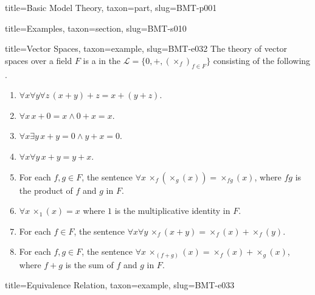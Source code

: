 \documentclass[a4paper]{article}
\begin{document}
\begin{tree}{title={Basic Model Theory}, taxon={part}, slug={BMT-p001}}
\begin{tree}{title={Examples}, taxon={section}, slug={BMT-s010}}
\begin{tree}{title={Vector Spaces}, taxon={example}, slug={BMT-e032}}
    The theory of vector spaces over a field \(F\) is a  in the  \(\mathcal  L= \{ 0,+,( \times _f)_{f \in  F} \}\)
    consisting of the following .
    \begin{enumerate}
\item{\(\forall  x \forall  y \forall  z \, (x+y)+z=x+(y+z)\).
        }
        \item{\(\forall  x \, x+0=x \land0 +x=x\).
        }
        \item{\(\forall  x \exists  y \, x+y=0 \land  y+x=0\).
        }
        \item{\(\forall  x \forall  y \, x+y=y+x\).
        }
        \item{
            For each \(f,g \in  F\), the sentence \(\forall  x \, \times _f( \times _g(x)) =  \times _{fg}(x)\), where \(fg\) is the product of \(f\) and \(g\) in \(F\).
        }
        \item{\(\forall  x \, \times _1(x) = x\) where \(1\) is the multiplicative identity in \(F\).
        }
        \item{
            For each \(f \in  F\), the sentence \(\forall  x \forall  y \, \times _f(x+y) =  \times _f(x)+ \times _f(y)\).
        }
        \item{
            For each \(f,g \in  F\), the sentence \(\forall  x \, \times _(f+g)(x) =  \times _f(x)+ \times _g(x)\), where \(f+g\) is the sum of \(f\) and \(g\) in \(F\).
        }
\end{enumerate}
\end{tree}

\begin{tree}{title={Equivalence Relation}, taxon={example}, slug={BMT-e033}}


\end{tree}
\end{tree}
\end{tree}
\end{document}
